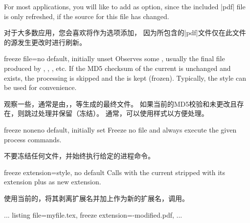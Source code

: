 
\begin{marker}
For most applications, you will like to add  as option,
since the included |pdf| file is only refreshed, if the source for this file
has changed.

对于大多数应用，您会喜欢将作为选项添加， 因为所包含的|pdf|文件仅在此文件的源发生更改时进行刷新。
\end{marker}

\begin{docTcbKey}[][doc new=2016-07-14]{freeze file}{=}{no default, initially unset}
Observes some , usually the final file produced by ,
, , etc.
If the MD5 checksum of the current  is unchanged
and  exists, the processing is skipped and
the  is kept (frozen).
Typically, the style  can be used for
convenience.

观察一些，通常是由，，等生成的最终文件。 如果当前的MD5校验和未更改且存在，则跳过处理并保留（冻结）。 通常，可以使用样式以方便处理。
\end{docTcbKey}

\begin{docTcbKey}[][doc new=2016-07-14]{freeze none}{}{no default, initially set}
Freeze no file and always execute the given process commands.

不要冻结任何文件，并始终执行给定的进程命令。
\end{docTcbKey}

\begin{docTcbKey}[][doc new=2016-07-14]{freeze extension}{=}{style, no default}
Calls  with the current 
stripped with its extension plus  as new extension.

使用当前的，将其剥离扩展名并加上作为新的扩展名，调用。
\begin{dispListing}
...
listing file=myfile.tex,
freeze extension=-modified.pdf,    %
...
\end{dispListing}
\end{docTcbKey}

